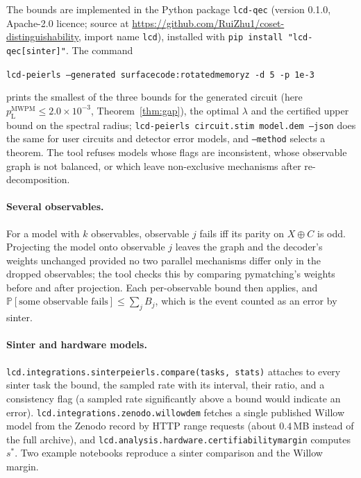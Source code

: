 \documentclass[11pt]{article}
\theoremstyle{plain}
\theoremstyle{definition}
\theoremstyle{remark}
\newcommand{\Prob}{\mathbb{P}}
\newcommand{\pM}{p_{\mathrm{L}}^{\mathrm{MWPM}}}
\newcommand{\tsc}[1]{\texttt{#1}}
\renewcommand{\_}{\oldunderscore\allowbreak}
\begin{document}
The bounds are implemented in the Python package \tsc{lcd-qec} (version 0.1.0, Apache-2.0 licence; source at \url{https://github.com/RuiZhu1/coset-distinguishability}, import name \tsc{lcd}), installed with \tsc{pip install "lcd-qec[sinter]"}. The command
\begin{center}\small
\tsc{lcd-peierls --generated surface\_code:rotated\_memory\_z -d 5 -p 1e-3}
\end{center}
prints the smallest of the three bounds for the generated circuit (here $\pM\le2.0\times10^{-3}$, Theorem~\ref{thm:gap}), the optimal $\lambda$ and the certified upper bound on the spectral radius; \tsc{lcd-peierls circuit.stim model.dem --json} does the same for user circuits and detector error models, and \tsc{--method} selects a theorem. The tool refuses models whose flags are inconsistent, whose observable graph is not balanced, or which leave non-exclusive mechanisms after re-decomposition.

\paragraph{Several observables.} For a model with $k$ observables, observable $j$ fails iff its parity on $X\oplus C$ is odd. Projecting the model onto observable $j$ leaves the graph and the decoder's weights unchanged provided no two parallel mechanisms differ only in the dropped observables; the tool checks this by comparing pymatching's weights before and after projection. Each per-observable bound then applies, and $\Prob[\text{some observable fails}]\le\sum_j B_j$, which is the event counted as an error by sinter.

\paragraph{Sinter and hardware models.} \tsc{lcd.\allowbreak integrations.\allowbreak sinter\_peierls.\allowbreak compare(tasks, stats)} attaches to every sinter task the bound, the sampled rate with its interval, their ratio, and a consistency flag (a sampled rate significantly above a bound would indicate an error). \tsc{lcd.\allowbreak integrations.\allowbreak zenodo.\allowbreak willow\_dem} fetches a single published Willow model from the Zenodo record by HTTP range requests (about $0.4$\,MB instead of the full archive), and \tsc{lcd.\allowbreak analysis.\allowbreak hardware.\allowbreak certifiability\_margin} computes $s^\ast$. Two example notebooks reproduce a sinter comparison and the Willow margin.
\end{document}
